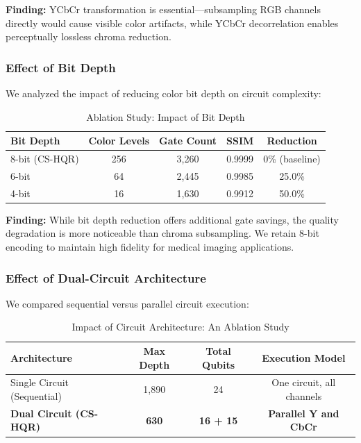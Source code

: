 \documentclass[11pt,a4paper]{article}
\begin{document}
\textbf{Finding:} YCbCr transformation is essential---subsampling RGB channels directly would cause visible color artifacts, while YCbCr decorrelation enables perceptually lossless chroma reduction.

\subsubsection{Effect of Bit Depth}

We analyzed the impact of reducing color bit depth on circuit complexity:

\begin{table}[H]
\centering
\caption{Ablation Study: Impact of Bit Depth}
\label{tab:ablation_bitdepth}
\begin{tabular}{@{}lcccc@{}}
\toprule
\textbf{Bit Depth} & \textbf{Color Levels} & \textbf{Gate Count} & \textbf{SSIM} & \textbf{Reduction} \\
\midrule
8-bit (CS-HQR) & 256 & 3,260 & 0.9999 & 0\% (baseline) \\
6-bit & 64 & 2,445 & 0.9985 & 25.0\% \\
4-bit & 16 & 1,630 & 0.9912 & 50.0\% \\
\bottomrule
\end{tabular}
\end{table}

\textbf{Finding:} While bit depth reduction offers additional gate savings, the quality degradation is more noticeable than chroma subsampling. We retain 8-bit encoding to maintain high fidelity for medical imaging applications.

\subsubsection{Effect of Dual-Circuit Architecture}

We compared sequential versus parallel circuit execution:

\begin{table}[H]
\centering
\caption{Impact of Circuit Architecture: An Ablation Study}
\label{tab:ablation_architecture}
\begin{tabular}{@{}lccc@{}}
\toprule
\textbf{Architecture} & \textbf{Max Depth} & \textbf{Total Qubits} & \textbf{Execution Model} \\
\midrule
Single Circuit (Sequential) & 1,890 & 24 & One circuit, all channels \\
\rowcolor{green!15}
\textbf{Dual Circuit (CS-HQR)} & \textbf{630} & \textbf{16 + 15} & \textbf{Parallel Y and CbCr} \\
\bottomrule
\end{tabular}
\end{table}
\end{document}
